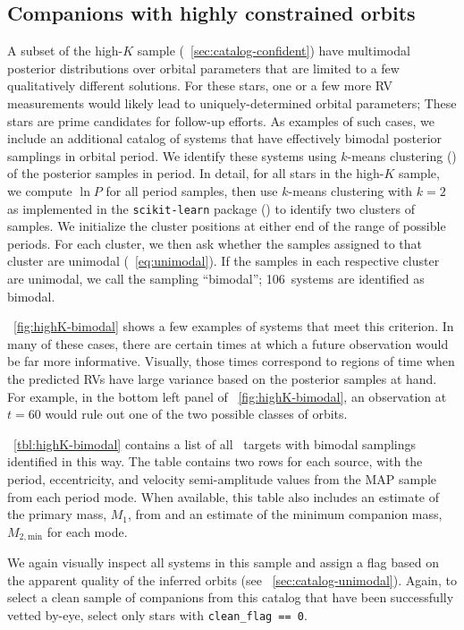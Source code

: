 \documentclass[modern, letterpaper]{aastex62}
\newcommand{\apogee}{\project{\acronym{APOGEE}}}
\newcommand{\nbimodal}{106}
\begin{document}
\subsection{Companions with highly constrained orbits}
\label{sec:catalog-multimodal}

A subset of the high-$K$ sample (\sectionname~\ref{sec:catalog-confident}) have
multimodal posterior distributions over orbital parameters that are limited to
a few qualitatively different solutions.
For these stars, one or a few more RV measurements would likely lead to
uniquely-determined orbital parameters; These stars are prime candidates for
follow-up efforts.
As examples of such cases, we include an additional catalog of systems that have
effectively bimodal posterior samplings in orbital period.
We identify these systems using $k$-means clustering (\citealt{Lloyd:1982}) of
the posterior samples in period.
In detail, for all stars in the high-$K$ sample, we compute $\ln P$ for all
period samples, then use $k$-means clustering with $k=2$ as implemented in the
\texttt{scikit-learn} package (\citealt{Pedregosa:2011}) to identify two
clusters of samples.
We initialize the cluster positions at either end of the range of possible
periods.
For each cluster, we then ask whether the samples assigned to that cluster are
unimodal (\eqname~\ref{eq:unimodal}).
If the samples in each respective cluster are unimodal, we call the sampling
``bimodal''; \nbimodal\ systems are identified as bimodal.

\figurename~\ref{fig:highK-bimodal} shows a few examples of systems that meet
this criterion.
In many of these cases, there are certain times at which a future observation
would be far more informative.
Visually, those times correspond to regions of time when the predicted RVs have
large variance based on the posterior samples at hand.
For example, in the bottom left panel of \figurename~\ref{fig:highK-bimodal}, an
observation at $t = 60$ would rule out one of the two possible  classes of
orbits.

\tablename~\ref{tbl:highK-bimodal} contains a list of all \apogee\ targets with
bimodal samplings identified in this way.
The table contains two rows for each source, with the period, eccentricity, and
velocity semi-amplitude values from the MAP sample from each period mode.
When available, this table also includes an estimate of the primary mass, $M_1$,
from \citet{Ness:2015} and an estimate of the minimum companion mass, $M_{2,
\textrm{min}}$ for each mode.

We again visually inspect all systems in this sample and assign a flag based on
the apparent quality of the inferred orbits (see
\sectionname~\ref{sec:catalog-unimodal}).
Again, to select a clean sample of companions from this catalog that have been
successfully vetted by-eye, select only stars with \texttt{clean\_flag == 0}.
\end{document}
